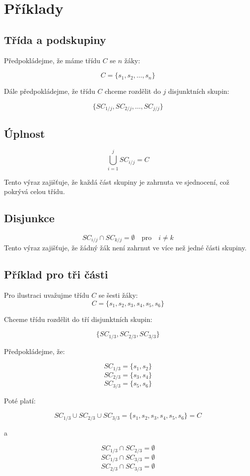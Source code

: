 \section{Příklady}

\subsection*{Třída a podskupiny}

Předpokládejme, že máme třídu \( C \) se \( n \) žáky:

\[
C = \{ s_1, s_2, \ldots, s_n \}
\]

Dále předpokládejme, že třídu \( C \) chceme rozdělit do \( j \) disjunktních skupin:

\[
\{ SC_{1/j}, SC_{2/j}, \ldots, SC_{j/j} \}
\]

\subsection*{Úplnost}

\[
\bigcup_{i=1}^{j} SC_{i/j} = C
\]

Tento výraz zajišťuje, že každá část skupiny je zahrnuta ve sjednocení, což pokrývá celou třídu.

\subsection*{Disjunkce}

\[
SC_{i/j} \cap SC_{k/j} = \emptyset \quad \text{pro} \quad i \neq k
\]
Tento výraz zajišťuje, že žádný žák není zahrnut ve více než jedné části skupiny.

\begin{samepage}
\subsection*{Příklad pro tři části}

Pro ilustraci uvažujme třídu \( C \) se šesti žáky:
\nopagebreak
\[
C = \{ s_1, s_2, s_3, s_4, s_5, s_6 \}
\]

\noindent
Chceme třídu rozdělit do tří disjunktních skupin:

\nopagebreak

\[
\{ SC_{1/3}, SC_{2/3}, SC_{3/3} \}
\]

\noindent
Předpokládejme, že:

\nopagebreak

\[
SC_{1/3} = \{ s_1, s_2 \}
\]
\[
SC_{2/3} = \{ s_3, s_4 \}
\]
\[
SC_{3/3} = \{ s_5, s_6 \}
\]

\noindent
Poté platí:

\[
SC_{1/3} \cup SC_{2/3} \cup SC_{3/3} = \{ s_1, s_2, s_3, s_4, s_5, s_6 \} = C
\]

\noindent
a

\[
SC_{1/3} \cap SC_{2/3} = \emptyset
\]
\[
SC_{1/3} \cap SC_{3/3} = \emptyset
\]
\[
SC_{2/3} \cap SC_{3/3} = \emptyset
\]
\end{samepage}

